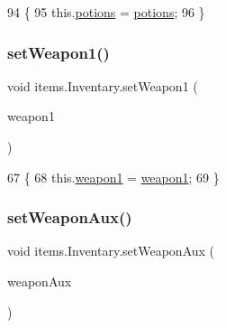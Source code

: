 \begin{DoxyCode}
94                                                       \{
95         this.\mbox{\hyperlink{classitems_1_1_inventary_afa542455e08a2cc05377133889b7b091}{potions}} = \mbox{\hyperlink{classitems_1_1_inventary_afa542455e08a2cc05377133889b7b091}{potions}};
96     \}
\end{DoxyCode}
\mbox{\label{classitems_1_1_inventary_a41de26269c15ca5a9ecac80c89f2454c}} 
\subsubsection{\texorpdfstring{set\+Weapon1()}{setWeapon1()}}
{\footnotesize\ttfamily void items.\+Inventary.\+set\+Weapon1 (\begin{DoxyParamCaption}\item[{\mbox{\hyperlink{classitems_1_1_weapon_item}{Weapon\+Item}}}]{weapon1 }\end{DoxyParamCaption})\hspace{0.3cm}{\ttfamily [inline]}}


\begin{DoxyCode}
67                                                \{
68         this.\mbox{\hyperlink{classitems_1_1_inventary_ad16ddfb714d749294e1fe64841ca9074}{weapon1}} = \mbox{\hyperlink{classitems_1_1_inventary_ad16ddfb714d749294e1fe64841ca9074}{weapon1}};
69     \}
\end{DoxyCode}
\mbox{\label{classitems_1_1_inventary_a920b6b914a6a972f6aeb92f5799755b9}} 
\subsubsection{\texorpdfstring{set\+Weapon\+Aux()}{setWeaponAux()}}
{\footnotesize\ttfamily void items.\+Inventary.\+set\+Weapon\+Aux (\begin{DoxyParamCaption}\item[{\mbox{\hyperlink{classitems_1_1_weapon_item}{Weapon\+Item}}}]{weapon\+Aux }\end{DoxyParamCaption})\hspace{0.3cm}{\ttfamily [inline]}}


